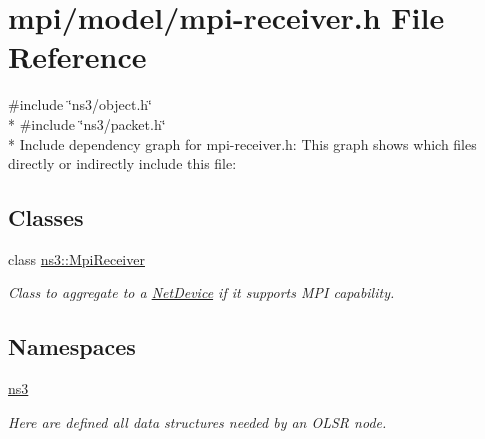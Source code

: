 \hypertarget{mpi-receiver_8h}{}\section{mpi/model/mpi-\/receiver.h File Reference}
\label{mpi-receiver_8h}
{\ttfamily \#include \char`\"{}ns3/object.\+h\char`\"{}}\\*
{\ttfamily \#include \char`\"{}ns3/packet.\+h\char`\"{}}\\*
Include dependency graph for mpi-\/receiver.h\+:
This graph shows which files directly or indirectly include this file\+:
\subsection*{Classes}
\begin{DoxyCompactItemize}
\item 
class \hyperlink{classns3_1_1MpiReceiver}{ns3\+::\+Mpi\+Receiver}
\begin{DoxyCompactList}\small\item\em Class to aggregate to a \hyperlink{classns3_1_1NetDevice}{Net\+Device} if it supports M\+PI capability. \end{DoxyCompactList}\end{DoxyCompactItemize}
\subsection*{Namespaces}
\begin{DoxyCompactItemize}
\item 
 \hyperlink{namespacens3}{ns3}
\begin{DoxyCompactList}\small\item\em Here are defined all data structures needed by an O\+L\+SR node. \end{DoxyCompactList}\end{DoxyCompactItemize}
